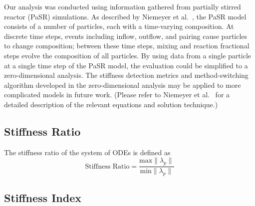 \documentclass[12pt]{ussci}
\begin{document}

Our analysis was conducted using information gathered from partially stirred reactor (PaSR) simulations.
As described by Niemeyer et al.~\cite{Niemeyer:2017}, the PaSR model consists of a number of particles, each with a time-varying composition.
At discrete time steps, events including inflow, outflow, and pairing cause particles to change composition; between these time steps, mixing and reaction fractional steps evolve the composition of all particles.
By using data from a single particle at a single time step of the PaSR model, the evaluation could be simplified to a zero-dimensional analysis.
The stiffness detection metrics and method-switching algorithm developed in the zero-dimensional analysis may be applied to more complicated models in future work.
(Please refer to Niemeyer et al.~\cite{Niemeyer:2017} for a detailed description of the relevant equations and solution technique.)

\subsection{Stiffness Ratio}

The stiffness ratio of the system of ODEs is defined as
\begin{equation}
	\textrm{Stiffness Ratio} = \frac{\textrm{max}\|\lambda_p\|}{\textrm{min}\|\lambda_p\|}
\end{equation}	

\subsection{Stiffness Index}
\end{document}
